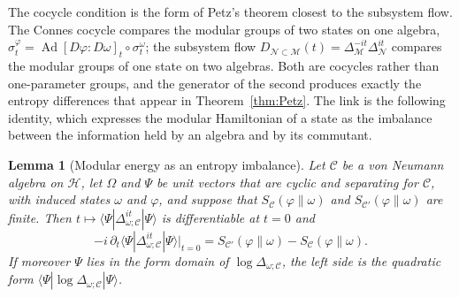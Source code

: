 \documentclass[a4paper,11pt]{article}
\newtheorem{lemma}[theorem]{Lemma}
\theoremstyle{definition}
\newcommand{\mN}{\mathcal{N}}
\newcommand{\mM}{\mathcal{M}}
\begin{document}
The cocycle condition is the form of Petz's theorem closest to the subsystem flow. The Connes cocycle compares the modular groups of two states on one algebra, $\sigma^{\varphi}_t=\operatorname{Ad}[D\varphi:D\omega]_t\circ\sigma^{\omega}_t$; the subsystem flow $D_{\mN\subset\mM}(t)=\Delta_{\mM}^{-it}\Delta_{\mN}^{it}$ compares the modular groups of one state on two algebras. Both are cocycles rather than one-parameter groups, and the generator of the second produces exactly the entropy differences that appear in Theorem~\ref{thm:Petz}. The link is the following identity, which expresses the modular Hamiltonian of a state as the imbalance between the information held by an algebra and by its commutant.

\begin{lemma}[Modular energy as an entropy imbalance]\label{lem:modular-energy}
Let $\mathcal C$ be a von Neumann algebra on $\mathcal H$, let $\Omega$ and $\Psi$ be unit vectors that are cyclic and separating for $\mathcal C$, with induced states $\omega$ and $\varphi$, and suppose that $S_{\mathcal C}(\varphi\|\omega)$ and $S_{\mathcal C'}(\varphi\|\omega)$ are finite. Then $t\mapsto\langle\Psi|\Delta_{\omega;\mathcal C}^{it}|\Psi\rangle$ is differentiable at $t=0$ and
\begin{equation}
 -i\,\partial_t\langle\Psi|\Delta_{\omega;\mathcal C}^{it}|\Psi\rangle\big|_{t=0}
 =S_{\mathcal C'}(\varphi\|\omega)-S_{\mathcal C}(\varphi\|\omega).
 \label{eq:modular-energy}
\end{equation}
If moreover $\Psi$ lies in the form domain of $\log\Delta_{\omega;\mathcal C}$, the left side is the quadratic form $\langle\Psi|\log\Delta_{\omega;\mathcal C}|\Psi\rangle$.
\end{lemma}
\end{document}
